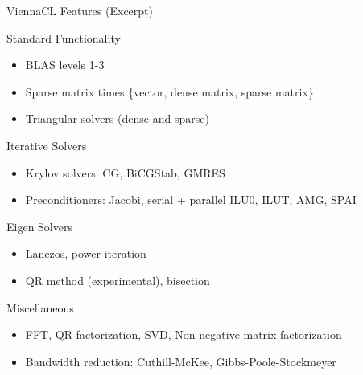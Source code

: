 






\begin{frame}{ViennaCL Features (Excerpt)}

\begin{block}{Standard Functionality}
\begin{itemize}
 \item BLAS levels 1-3
 \item Sparse matrix times \{vector, dense matrix, sparse matrix\}
 \item Triangular solvers (dense and sparse)
\end{itemize}
\end{block}
\vspace*{-0.3cm}


\begin{block}{Iterative Solvers}
\begin{itemize}
 \item Krylov solvers: CG, BiCGStab, GMRES
 \item Preconditioners: Jacobi, serial + parallel ILU0, ILUT, AMG, SPAI
\end{itemize}
\end{block}
\vspace*{-0.3cm}


\begin{block}{Eigen Solvers}
\begin{itemize}
 \item Lanczos, power iteration
 \item QR method (experimental), bisection
\end{itemize}
\end{block}
\vspace*{-0.3cm}


\begin{block}{Miscellaneous}
\begin{itemize}
 \item FFT, QR factorization, SVD, Non-negative matrix factorization
 \item Bandwidth reduction: Cuthill-McKee, Gibbs-Poole-Stockmeyer
\end{itemize}
\end{block}

\end{frame}





